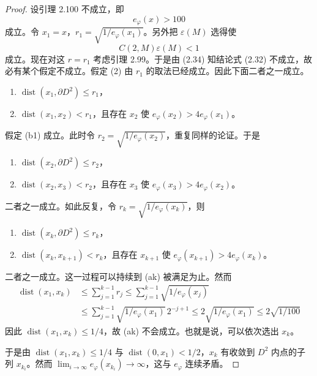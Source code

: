 \begin{proof}
  设引理 2.100 不成立，即
  \begin{equation}
    e_\varphi(x)>100 \tag{2.33}
  \end{equation}
  成立。令 $x_1=x$，$r_1=\sqrt{1/e_\varphi(x_1)}$。另外把 $\varepsilon(M)$ 选得使
  \begin{equation}
    C(2,M)\varepsilon(M)<1 \tag{2.34}
  \end{equation}
  成立。现在对这 $r=r_1$ 考虑引理 2.99。于是由 (2.34) 知结论式 (2.32) 不成立，故必有某个假定不成立。假定 (2) 由 $r_1$ 的取法已经成立。因此下面二者之一成立。
  \begin{enumerate}[leftmargin=3.8em]
    \item[（a1）] $\operatorname{dist}(x_1,\partial D^2)\le r_1$，
    \item[（b1）] $\operatorname{dist}(x_1,x_2)<r_1$，且存在 $x_2$ 使 $e_\varphi(x_2)>4e_\varphi(x_1)$。
  \end{enumerate}
  假定 (b1) 成立。此时令 $r_2=\sqrt{1/e_\varphi(x_2)}$，重复同样的论证。于是
  \begin{enumerate}[leftmargin=3.8em]
    \item[（a2）] $\operatorname{dist}(x_2,\partial D^2)\le r_2$，
    \item[（b2）] $\operatorname{dist}(x_2,x_3)<r_2$，且存在 $x_3$ 使 $e_\varphi(x_3)>4e_\varphi(x_2)$。
  \end{enumerate}
  二者之一成立。如此反复，令 $r_k=\sqrt{1/e_\varphi(x_k)}$，则
  \begin{enumerate}[leftmargin=3.8em]
    \item[（ak）] $\operatorname{dist}(x_k,\partial D^2)\le r_k$，
    \item[（bk）] $\operatorname{dist}(x_k,x_{k+1})<r_k$，且存在 $x_{k+1}$ 使 $e_\varphi(x_{k+1})>4e_\varphi(x_k)$。
  \end{enumerate}

  二者之一成立。这一过程可以持续到 (ak) 被满足为止。然而
  \[
  \begin{aligned}
    \operatorname{dist}(x_1,x_k)&\le\sum_{j=1}^{k-1}r_j
    \le\sum_{j=1}^{k-1}\sqrt{1/e_\varphi(x_j)}\\
    &\le\sum_{j=1}^{k-1}\sqrt{1/e_\varphi(x_1)}\,2^{-j+1}
    \le2\sqrt{1/e_\varphi(x_1)}\le2\sqrt{1/100}
  \end{aligned}
  \]
  因此 $\operatorname{dist}(x_1,x_k)\le1/4$，故 (ak) 不会成立。也就是说，可以依次选出 $x_k$。

  于是由 $\operatorname{dist}(x_1,x_k)\le1/4$ 与 $\operatorname{dist}(0,x_1)<1/2$，$x_k$ 有收敛到 $D^2$ 内点的子列 $x_{k_i}$。然而 $\lim_{i\to\infty}e_\varphi(x_{k_i})\to\infty$，这与 $e_\varphi$ 连续矛盾。
\end{proof}

